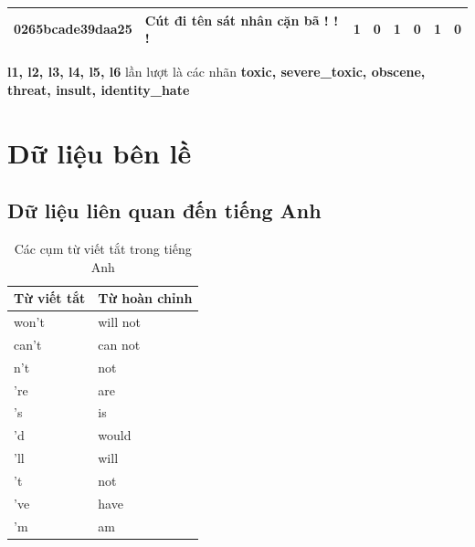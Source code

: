 \begin{table}[htb]
{\begin{minipage}{\textheight}
\begin{threeparttable}
\begin{tabularx}{\textwidth}{L{0.8} L{6.6} C{0.1} C{0.1} C{0.1} C{0.1} C{0.1} C{0.1}}
                    0265bcade39daa25 & Cút đi tên sát nhân cặn bã ! ! !                                                                                                  & 1           & 0           & 1           & 0           & 1           & 0           \\
                    \bottomrule
                \end{tabularx}
                \begin{tablenotes}
                    \fontsize{8pt}{12pt}\selectfont
                    \item \textbf{l1, l2, l3, l4, l5, l6} lần lượt là các nhãn \textbf{toxic, severe\_toxic, obscene, threat, insult, identity\_hate}
                \end{tablenotes}
            \end{threeparttable}
        \end{minipage}%
    }
\end{table}
\clearpage

\section*{Dữ liệu bên lề}
\subsection*{Dữ liệu liên quan đến tiếng Anh}
\begin{table}[htb]
    \centering
    \caption{Các cụm từ viết tắt trong tiếng Anh}
    \label{table:english-contractions}
    \begin{tabular}{ll}
        \toprule
        \textbf{Từ viết tắt} & \textbf{Từ hoàn chỉnh} \\\midrule
        won't                & will not               \\
        can't                & can not                \\
        n't                  & not                    \\
        're                  & are                    \\
        's                   & is                     \\
        'd                   & would                  \\
        'll                  & will                   \\
        't                   & not                    \\
        've                  & have                   \\
        'm                   & am                     \\
        \bottomrule
    \end{tabular}
\end{table}

